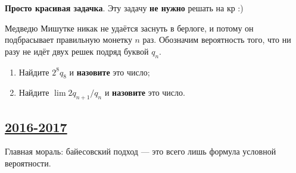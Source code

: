 \textbf{Просто красивая задачка}. Эту задачу \textbf{не нужно} решать на кр :)

Медведю Мишутке никак не удаётся заснуть в берлоге, и потому он подбрасывает
правильную монетку $n$ раз.
Обозначим вероятность того, что ни разу не идёт двух решек подряд буквой $q_n$.

\begin{enumerate}[label=\asbuk*)]
\item Найдите $2^8q_8$ и \textbf{назовите} это число;
\item Найдите $\lim 2q_{n+1}/q_n$ и \textbf{назовите} это число.
\end{enumerate}


\newpage
\subsection[2016-2017]{\hyperref[sec:sol_kr_03_ip_2016_2017]{2016-2017}}
\label{sec:kr_03_ip_2016_2017}

Главная мораль: байесовский подход — это всего лишь формула условной вероятности.

